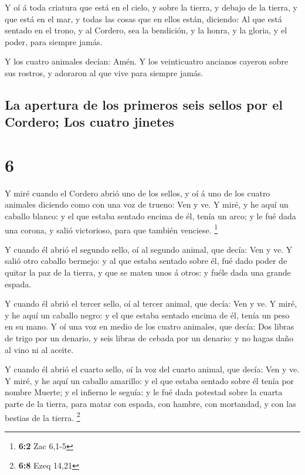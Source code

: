  Y oí á toda criatura que está en el cielo, y sobre la
tierra, y debajo de la tierra, y que está en el mar, y todas las cosas
que en ellos están, diciendo: Al que está sentado en el trono, y al
Cordero, sea la bendición, y la honra, y la gloria, y el poder, para
siempre jamás.

 Y los cuatro animales decían: Amén. Y los veinticuatro
ancianos cayeron sobre sus rostros, y adoraron al que vive para siempre
jamás.

\hypertarget{la-apertura-de-los-primeros-seis-sellos-por-el-cordero-los-cuatro-jinetes}{%
\subsection{La apertura de los primeros seis sellos por el Cordero; Los
cuatro
jinetes}\label{la-apertura-de-los-primeros-seis-sellos-por-el-cordero-los-cuatro-jinetes}}

\hypertarget{section-5}{%
\section{6}\label{section-5}}

 Y miré cuando el Cordero abrió uno de los sellos, y oí á
uno de los cuatro animales diciendo como con una voz de trueno: Ven y
ve.  Y miré, y he aquí un caballo blanco: y el que estaba
sentado encima de él, tenía un arco; y le fué dada una corona, y salió
victorioso, para que también venciese. \footnote{\textbf{6:2} Zac 6,1-5}

 Y cuando él abrió el segundo sello, oí al segundo animal,
que decía: Ven y ve.  Y salió otro caballo bermejo: y al
que estaba sentado sobre él, fué dado poder de quitar la paz de la
tierra, y que se maten unos á otros: y fuéle dada una grande espada.

 Y cuando él abrió el tercer sello, oí al tercer animal,
que decía: Ven y ve. Y miré, y he aquí un caballo negro: y el que estaba
sentado encima de él, tenía un peso en su mano.  Y oí una
voz en medio de los cuatro animales, que decía: Dos libras de trigo por
un denario, y seis libras de cebada por un denario: y no hagas daño al
vino ni al aceite.

 Y cuando él abrió el cuarto sello, oí la voz del cuarto
animal, que decía: Ven y ve.  Y miré, y he aquí un caballo
amarillo: y el que estaba sentado sobre él tenía por nombre Muerte; y el
infierno le seguía: y le fué dada potestad sobre la cuarta parte de la
tierra, para matar con espada, con hambre, con mortandad, y con las
bestias de la tierra. \footnote{\textbf{6:8} Ezeq 14,21}

